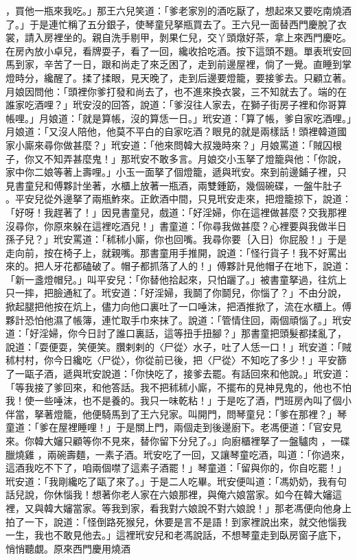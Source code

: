 ，買他一瓶來我吃。」那王六兒笑道：「爹老家別的酒吃厭了，想起來又要吃南燒酒了。」于是連忙稱了五分銀子，使琴童兒拏瓶買去了。王六兒一面替西門慶脫了衣裳，請入房裡坐的。親自洗手剔甲，剝果仁兒，交丫頭燉好茶，拿上來西門慶吃。在房內放小卓兒，看牌耍子，看了一回，纔收拾吃酒。按下這頭不題。單表玳安回馬到家，辛苦了一日，跟和尚走了來乏困了，走到前邊屋裡，倘了一覺。直睡到掌燈時分，纔醒了。揉了揉眼，見天晚了，走到后邊要燈籠，要接爹去。只顧立著。月娘因問他：「頭裡你爹打發和尚去了，也不進來換衣裳，三不知就去了。端的在誰家吃酒哩？」玳安沒的回答，說道：「爹沒往人家去，在獅子街房子裡和你哥算帳哩。」月娘道：「就是算帳，沒的算恁一日。」玳安道：「算了帳，爹自家吃酒哩。」月娘道：「又沒人陪他，他莫不平白的自家吃酒？眼見的就是兩樣話！頭裡韓道國家小廝來尋你做甚麼？」玳安道：「他來問韓大叔幾時來？」月娘罵道：「賊囚根子，你又不知弄甚麼鬼！」那玳安不敢多言。月娘交小玉拏了燈籠與他：「你說，家中你二娘等著上壽哩。」小玉一面拏了個燈籠，遞與玳安。來到前邊鋪子裡，只見書童兒和傅夥計坐著，水櫃上放著一瓶酒，兩雙鍾筯，幾個碗碟，一盤牛肚子 。平安兒從外邊拏了兩瓶鮓來。正飲酒中間，只見玳安走來，把燈籠掠下，說道：「好呀！我趕著了！」因見書童兒，戲道：「好淫婦，你在這裡做甚麼？交我那裡沒尋你，你原來躲在這裡吃酒兒！」書童道：「你尋我做甚麼？心裡要與我做半日孫子兒？」玳安罵道：「秫秫小廝，你也回嘴。我尋你要｛入日｝你屁股！」于是走向前，按在椅子上，就親嘴。那書童用手推開，說道：「怪行貨子！我不好罵出來的。把人牙花都磕破了。帽子都抓落了人的！」傅夥計見他帽子在地下，說道：「新一盞燈帽兒。」叫平安兒：「你替他拾起來，只怕躧了。」被書童拏過，往炕上只一摔，把臉通紅了。玳安道：「好淫婦，我鬬了你鬬兒，你惱了？」不由分說，掀起腿把他按在炕上，儘力向他口裏吐了一口唾沫，把酒推掀了，流在水櫃上。傅夥計恐怕他濕了帳簿，連忙取手巾來抹了。說道：「管情住回，兩個頑惱了。」玳安道：「好淫婦，你今日討了誰口裏話，這等扭手扭腳？」那書童把頭髮都揉亂了，說道：「耍便耍，笑便笑。臢剌剌的〈尸從〉水子，吐了人恁一口！」玳安道：「賊秫村村，你今日纔吃〈尸從〉，你從前已後，把〈尸從〉不知吃了多少！」平安篩了一甌子酒，遞與玳安說道：「你快吃了，接爹去罷。有話回來和他說。」玳安道：「等我接了爹回來，和他答話。我不把秫秫小廝，不擺布的見神見鬼的，他也不怕我！使一些唾沫，也不是養的。我只一味乾粘！」于是吃了酒，門班房內叫了個小伴當，拏著燈籠，他便騎馬到了王六兒家。叫開門，問琴童兒：「爹在那裡？」琴童道：「爹在屋裡睡哩！」于是關上門，兩個走到後邊廚下。老馮便道：「官安見來。你韓大嬸只顧等你不見來，替你留下分兒了。」向廚櫃裡拏了一盤驢肉 ，一碟臘燒雞 ，兩碗壽麵，一素子酒。玳安吃了一回，又讓琴童吃酒，叫道：「你過來，這酒我吃不下了，咱兩個噤了這素子酒罷！」琴童道：「留與你的，你自吃罷！」玳安道：「我剛纔吃了甌了來了。」于是二人吃畢。玳安便叫道：「馮奶奶，我有句話兒說，你休惱我！想著你老人家在六娘那裡，與俺六娘當家。如今在韓大嬸這裡，又與韓大嬸當家。等我到家，看我對六娘說不對六娘說！」那老馮便向他身上拍了一下，說道：「怪倒路死猴兒，休要是言不是語！到家裡說出來，就交他惱我一生，我也不敢見他去。」這裡玳安兒和老馮說話，不想琴童走到臥房窗子底下，悄悄聽覷。原來西門慶用燒酒 